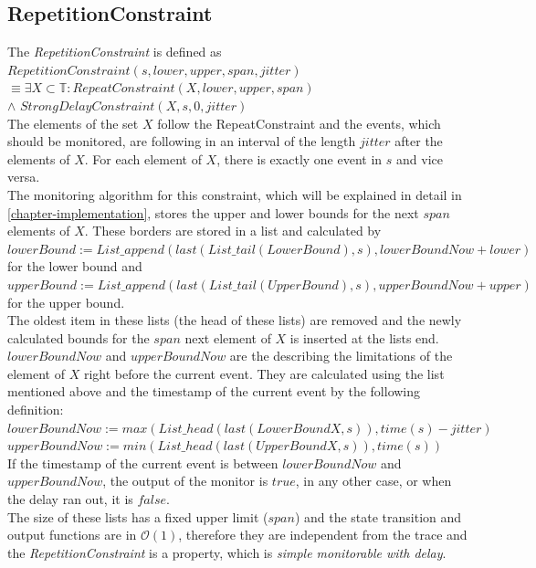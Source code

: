 \subsection{RepetitionConstraint}
	The \emph{RepetitionConstraint} is defined as\\[10pt]
		$RepetitionConstraint(s, lower, upper, span, jitter)$\\
		$\equiv \exists X\subset \mathbb{T}: RepeatConstraint (X, lower, upper, span)$\\
		\hspace{7cm}$\land$ $StrongDelayConstraint(X, s, 0, jitter)$\\[10pt]
	The elements of the set $X$ follow the RepeatConstraint and the events, which should be monitored, are following in an interval of the length $jitter$ after the elements of $X$. For each element of $X$, there is exactly one event in $s$ and vice versa.\\
	The monitoring algorithm for this constraint, which will be explained in detail in \ref{chapter-implementation}, stores the upper and lower bounds for the next $span$ elements of $X$.
	These borders are stored in a list and calculated by\\[10pt]
	$lowerBound:= List\_append(last(List\_tail(LowerBound), s), lowerBoundNow + lower)$ \\for the lower bound and\\
	$upperBound:= List\_append(last(List\_tail(UpperBound), s), upperBoundNow + upper)$ \\for the upper bound.\\[10pt]
	The oldest item in these lists (the head of these lists) are removed and the newly calculated bounds for the $span$ next element of $X$ is inserted at the lists end. $lowerBoundNow$ and $upperBoundNow$ are the describing the limitations of the element of $X$ right before the current event. They are calculated using the list mentioned above and the timestamp of the current event by the following definition:\\[10pt]
	$lowerBoundNow:= max(List\_head(last(LowerBoundX, s)), time(s)-jitter)$\\
	$upperBoundNow:= min(List\_head(last(UpperBoundX, s)), time(s))$\\[10pt]
	If the timestamp of the current event is between $lowerBoundNow$ and $upperBoundNow$, the output of the monitor is $true$, in any other case, or when the delay ran out, it is $false$.\\
	The size of these lists has a fixed upper limit ($span$) and the state transition and output functions are in $\mathcal{O}(1)$, therefore they are independent from the trace and the \emph{RepetitionConstraint} is a property, which is \textit{simple monitorable with delay}.
	
